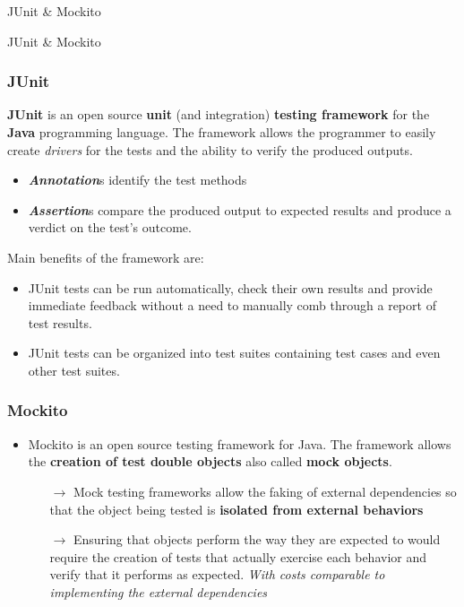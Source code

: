 \documentclass{beamer}
\theoremstyle{definition}
\begin{document}
\begin{section}{JUnit \& Mockito}
	\begin{subsection}{JUnit \& Mockito}
		
		\begin{frame}
			
			\frametitle{JUnit}
			{\small 
				\textbf{JUnit} is an open source \textbf{unit} (and integration) \textbf{testing framework} for the \textbf{Java} programming language.
				The framework allows the programmer to easily create \textit{drivers} for the tests and the ability to verify the produced outputs. 
				\begin{itemize}
					
					\item \textit{\textbf{Annotation}}s identify the test methods 
					\item \textit{\textbf{Assertion}}s compare the produced output to expected results and produce a verdict on the test's outcome. 
					
				\end{itemize}
				Main benefits of the framework are: \begin{itemize}
					\item JUnit tests can be run automatically, check their own results and provide immediate feedback without a need to manually comb through a report of test results.
					
					\item JUnit tests can be organized into test suites containing test cases and even other test suites.
				
					
				\end{itemize}}
			\end{frame}
			\begin{frame}
				\frametitle{Mockito}
				\begin{itemize}
			\item Mockito is an open source testing framework for Java. The framework allows the \textbf{creation of test double objects} also called \textbf{mock objects}.
					
		\begin{itemize}
				\item[$ \rightarrow $] Mock testing frameworks allow the faking of external dependencies so that the object being tested is \textbf{isolated from external behaviors}
				
				 \item[$ \rightarrow $] Ensuring that objects perform the way they are expected to would require the creation of tests that actually exercise each behavior and verify that it performs as expected. \textit{With costs comparable to implementing the external dependencies}
				

\end{itemize}
\end{itemize}
\end{frame}
\end{subsection}
\end{section}
\end{document}
